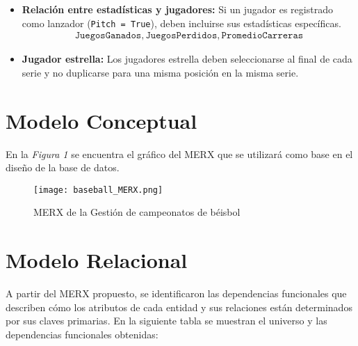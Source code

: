 \documentclass{report}
\begin{document}
\begin{itemize}
        \item \textbf{Relación entre estadísticas y jugadores:} Si un jugador es registrado como lanzador 
        (\texttt{Pitch = True}), deben incluirse sus estadísticas específicas.
        \begin{align*}
            \texttt{JuegosGanados}, \texttt{JuegosPerdidos}, \texttt{PromedioCarreras}
        \end{align*}

        \item \textbf{Jugador estrella:} Los jugadores estrella deben seleccionarse al final de cada serie y no 
        duplicarse para una misma posición en la misma serie.
    \end{itemize}

    \newpage

    \section*{Modelo Conceptual}

    En la \textit{Figura 1} se encuentra el gráfico del MERX que se utilizará como base en el diseño de la base de 
    datos.

    \begin{figure}[H] 
        \centering
        \texttt{[image: baseball\_MERX.png]}
        \caption{MERX de la Gestión de campeonatos de béisbol}
    \end{figure}

    \newpage

    \section*{Modelo Relacional}

    A partir del MERX propuesto, se identificaron las dependencias funcionales que describen cómo los atributos de cada entidad y sus relaciones están determinados por sus claves primarias.
    En la siguiente tabla se muestran el universo y las dependencias funcionales obtenidas: \newline
    
\end{document}
